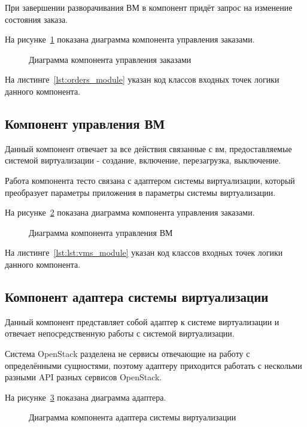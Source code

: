 При завершении разворачивания ВМ в компонент придёт запрос на изменение состояния заказа.

На рисунке~\ref{fig:order_control_scheme} показана диаграмма компонента управления заказами.
\begin{figure}[ht]
  \caption{Диаграмма компонента управления заказами}\label{fig:order_control_scheme}
\end{figure}

На листинге~\ref{lst:orders_module} указан код классов входных точек логики данного компонента.


\subsection{Компонент управления ВМ}\label{sec:subs2}
Данный компонент отвечает за все действия связанные с вм, предоставляемые системой виртуализации - создание, включение, перезагрузка, выключение.

Работа компонента тесто связана с адаптером системы виртуализации, который преобразует параметры приложения в параметры системы виртуализации.

На рисунке~\ref{fig:vm_control_scheme} показана диаграмма компонента управления заказами.
\begin{figure}[ht]
  \caption{Диаграмма компонента управления ВМ}\label{fig:vm_control_scheme}
\end{figure}

На листинге~\ref{lst:lst:vms_module} указан код классов входных точек логики данного компонента.

\subsection{Компонент адаптера системы виртуализации}\label{sec:subs3}
Данный компонент представляет собой адаптер к системе виртуализации и отвечает непосредственную работы с системой виртуализации.

Система OpenStack разделена не сервисы отвечающие на работу с определёнными сущностями, поэтому адаптеру приходится работать с нескольми разными API разных сервисов OpenStack.

На рисунке~\ref{fig:virt_adapter_scheme} показана диаграмма адаптера.
\begin{figure}[ht]
  \caption{Диаграмма компонента адаптера системы виртуализации}\label{fig:virt_adapter_scheme}
\end{figure}


